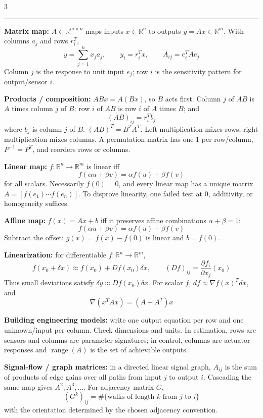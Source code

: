 \documentclass[10pt]{article}
\newcommand{\sect}[1]{\vspace{0.9pt}{\fontsize{7.2}{7.5}\selectfont\textbf{#1}}\vspace{0.25pt}\hrule\vspace{0.8pt}}
\newcommand{\sub}[1]{\textbf{#1}}
\newcommand{\R}{\mathbb{R}}
\newcommand{\range}{\operatorname{range}}
\begin{document}
\fontsize{6.25}{6.63}\selectfont
\setlength{\abovedisplayskip}{1.4pt}
\setlength{\belowdisplayskip}{1.4pt}
\setlength{\abovedisplayshortskip}{0.5pt}
\setlength{\belowdisplayshortskip}{0.8pt}
\setlength{\jot}{1.2pt}
\begin{multicols*}{3}

\sect{Linear Maps and Models (Lectures 1--4)}
\sub{Matrix map:} \(A\in\R^{m\times n}\) maps inputs \(x\in\R^n\) to
outputs \(y=Ax\in\R^m\). With columns \(a_j\) and rows \(r_i^T\),
\[
y=\sum_{j=1}^n x_ja_j,\qquad y_i=r_i^Tx,\qquad A_{ij}=e_i^TAe_j
\]
Column \(j\) is the response to unit input \(e_j\); row \(i\) is the
sensitivity pattern for output/sensor \(i\).

\sub{Products / composition:} \(ABx=A(Bx)\), so \(B\) acts first.
Column \(j\) of \(AB\) is \(A\) times column \(j\) of \(B\); row \(i\) of
\(AB\) is row \(i\) of \(A\) times \(B\); and
\[
(AB)_{ij}=r_i^Tb_j
\]
where \(b_j\) is column \(j\) of \(B\). \((AB)^T=B^TA^T\). Left
multiplication mixes rows; right multiplication
mixes columns. A permutation matrix has one \(1\) per row/column,
\(P^{-1}=P^T\), and reorders rows or columns.

\sub{Linear map:} \(f:\R^n\to\R^m\) is linear iff
\[
f(\alpha u+\beta v)=\alpha f(u)+\beta f(v)
\]
for all scalars. Necessarily \(f(0)=0\), and every linear map has a unique
matrix \(A=[f(e_1)\cdots f(e_n)]\). To disprove linearity, one failed test
at \(0\), additivity, or homogeneity suffices.

\sub{Affine map:} \(f(x)=Ax+b\) iff it preserves affine combinations
\(\alpha+\beta=1\):
\[
f(\alpha u+\beta v)=\alpha f(u)+\beta f(v)
\]
Subtract the offset: \(g(x)=f(x)-f(0)\) is linear and \(b=f(0)\).

\sub{Linearization:} for differentiable \(f:\R^n\to\R^m\),
\[
f(x_0+\delta x)\approx f(x_0)+Df(x_0)\delta x,\qquad
(Df)_{ij}=\frac{\partial f_i}{\partial x_j}(x_0)
\]
Thus small deviations satisfy \(\delta y\approx Df(x_0)\delta x\).
For scalar \(f\), \(df\approx\nabla f(x)^Tdx\), and
\[
\nabla(x^TAx)=(A+A^T)x
\]

\sub{Building engineering models:} write one output equation per row and
one unknown/input per column. Check dimensions and units. In estimation,
rows are sensors and columns are parameter signatures; in control, columns
are actuator responses and \(\range(A)\) is the set of achievable outputs.

\sub{Signal-flow / graph matrices:} in a directed linear signal graph,
\(A_{ij}\) is the sum of products of edge gains over all paths from input
\(j\) to output \(i\). Cascading the same map gives \(A^2,A^3,\ldots\).
For adjacency matrix \(G\),
\[
(G^k)_{ij}=\#\{\text{walks of length }k\text{ from }j\text{ to }i\}
\]
with the orientation determined by the chosen adjacency convention.


\end{multicols*}
\end{document}
